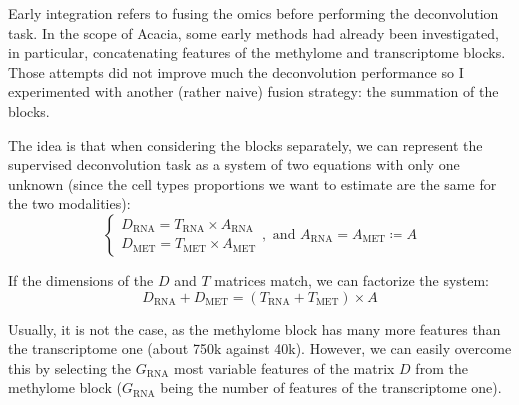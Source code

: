 \documentclass{article}
\begin{document}
Early integration refers to fusing the omics before performing the deconvolution task.
In the scope of Acacia, some early methods had already been investigated, in particular, concatenating features of the methylome and transcriptome blocks.
Those attempts did not improve much the deconvolution performance so I experimented with another (rather naive) fusion strategy: the summation of the blocks.

The idea is that when considering the blocks separately, we can represent the supervised deconvolution task as a system of two equations with only one unknown (since the cell types proportions we want to estimate are the same for the two modalities):
$$
\begin{cases}
  D_\text{RNA} = T_\text{RNA} \times A_\text{RNA} \\
  D_\text{MET} = T_\text{MET} \times A_\text{MET}
\end{cases}, \text{ and } A_\text{RNA} = A_\text{MET} \coloneqq A
$$

If the dimensions of the $D$ and $T$ matrices match, we can factorize the system:
$$D_\text{RNA} + D_\text{MET} = (T_\text{RNA} + T_\text{MET}) \times A$$

Usually, it is not the case, as the methylome block has many more features than the transcriptome one (about 750k against 40k).
However, we can easily overcome this by selecting the $G_\text{RNA}$ most variable features of the matrix $D$ from the methylome block ($G_\text{RNA}$ being the number of features of the transcriptome one).
\end{document}
